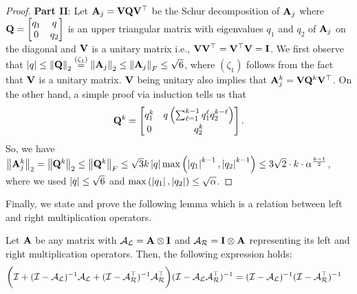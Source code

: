 \begin{proof}
	\textbf{Part II}: Let $\mathbf{A}_j = \mathbf{V} \mathbf{Q} \mathbf{V}^{\top}$ be the Schur decomposition of $\mathbf{A}_j$ where $\mathbf{Q} = \begin{bmatrix}
	q_1 & q \\ 0 & q_2
	\end{bmatrix}$ is an upper triangular matrix with eigenvalues $q_1$ and $q_2$ of $\mathbf{A}_j$ on the diagonal and $\mathbf{V}$ is a unitary matrix i.e., $\mathbf{V} \mathbf{V}^{\top} = \mathbf{V}^{\top} \mathbf{V} = \mathbf{I}$. We first observe that $\left|{q}\right| \leq \left\| \mathbf{Q} \right\|_2 \stackrel{(\zeta_1)}{=} \left\| \mathbf{A}_j \right\|_2 \leq \left\| \mathbf{A}_j \right\|_F \leq \sqrt{6}$, where $(\zeta_1)$ follows from the fact that $\mathbf{V}$ is a unitary matrix. $\mathbf{V}$ being unitary also implies that $\mathbf{A}_j^k = \mathbf{V} \mathbf{Q}^k \mathbf{V}^{\top}$. On the other hand, a simple proof via induction tells us that
	\begin{align*}
		\mathbf{Q}^k = \begin{bmatrix}
		q_1^k & q \left(\sum_{\ell = 1}^{k-1} q_1^{\ell}q_2^{k-\ell}\right) \\ 0 & q_2^k
		\end{bmatrix}.
	\end{align*}
	So, we have $\left\| \mathbf{A}_j^k \right\|_2 = \left\| \mathbf{Q}^k \right\|_2 \leq \left\| \mathbf{Q}^k \right\|_F \leq \sqrt{3}k \left|{q}\right| \max\left(\left|{q_1}\right|^{k-1}, \left|{q_2}\right|^{k-1}\right) \leq 3\sqrt{2} \cdot k \cdot \alpha^{\frac{k-1}{2}}$, where we used $\left|{q}\right| \leq \sqrt{6}$ and $\max\left(\left|{q_1}\right|,\left|{q_2}\right|\right) \leq \sqrt{\alpha}$.
\end{proof}
Finally, we state and prove the following lemma which is a relation between left and right multiplication operators.
\begin{lemma}
	\label{lem:lhs-psd-lemma}
	Let $\mathbf{A}$ be any matrix with $\mathcal{A}_{\mathcal{L}}=\mathbf{A}\otimes\mathbf{I}$ and $\mathcal{A}_{\mathcal{R}}=\mathbf{I}\otimes\mathbf{A}$ representing its left and right multiplication operators. Then, the following expression holds:
	\begin{align*}
	\bigg(\mathcal{I} + (\mathcal{I}-\mathcal{A}_{\mathcal{L}})^{-1}\mathcal{A}_{\mathcal{L}} + (\mathcal{I}-\mathcal{A}_{\mathcal{R}}^{\top})^{-1}\mathcal{A}_{\mathcal{R}}^{\top}\bigg)(\mathcal{I}-\mathcal{A}_{\mathcal{L}}\mathcal{A}_{\mathcal{R}}^{\top})^{-1}&=(\mathcal{I}-\mathcal{A}_{\mathcal{L}})^{-1}(\mathcal{I}-\mathcal{A}_{\mathcal{R}}^{\top})^{-1}
	\end{align*}
\end{lemma}
